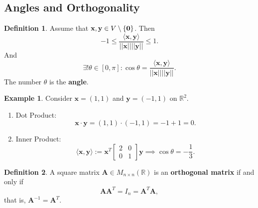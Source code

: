 \documentclass[12pt,openany]{book}
\theoremstyle{definition}
\newtheorem{definition}{Definition}[chapter]
\newtheorem{example}{Example}[chapter]
\newcommand{\R}{\mathbb{R}}
\newcommand{\by}{\times}
\newcommand{\inner}[1]{\langle #1\rangle}
\newcommand{\norms}[1]{|| #1||}
\begin{document}
	\subsection{Angles and Orthogonality}
	\begin{tcolorbox}[colframe=defcolor,title={\color{white}\bf Angle}]
		\begin{definition}
			Assume that \(\textbf{x},\textbf{y}\in V\setminus\set{\textbf{0}}\). Then \[
			-1\leq\frac{\inner{\textbf{x},\textbf{y}}}{\norms{\textbf{x}}\norms{\textbf{y}}}\leq 1.
			\] And \[
			\exists !\theta\in[0,\pi]:\cos\theta=\frac{\inner{\textbf{x},\textbf{y}}}{\norms{\textbf{x}}\norms{\textbf{y}}}.
			\] The number \(\theta\) is the \textbf{angle}.
		\end{definition}
	\end{tcolorbox}
	\begin{example}
		Consider \(\textbf{x}=(1,1)\) and \(\textbf{y}=(-1,1)\) on \(\R^2\).
		\begin{enumerate}[(1)]
			\item Dot Product: \[
			\textbf{x}\cdot \textbf{y}=(1,1)\cdot(-1,1)=-1+1=0.
			\]
			\item Inner Product: \[
			\inner{\textbf{x},\textbf{y}}:=\textbf{x}^T\begin{bmatrix}
				2&0\\0&1
			\end{bmatrix}\textbf{y}\implies\cos\theta=-\frac{1}{3}.
			\]
		\end{enumerate}
	\end{example}
	\vspace{8pt}
	\begin{tcolorbox}[colframe=defcolor,title={\color{white}\bf Orthogonal Matrix}]
		\begin{definition}
			A square matrix \(\textbf{A}\in M_{n\by n}(\R)\) is an \textbf{orthogonal matrix} if and only if \[
			\textbf{A}\textbf{A}^T=I_n=\textbf{A}^T\textbf{A},
			\] that is, \(\textbf{A}^{-1}=\textbf{A}^T\).
		\end{definition}
	\end{tcolorbox}
\end{document}
